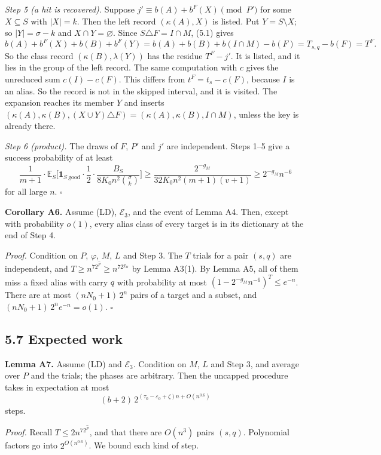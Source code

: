 \documentclass[10pt,a4paper]{article}
\begin{document}
\emph{Step 5 (a hit is recovered).} Suppose $j' \equiv b(A) + b^F(X) \pmod{P'}$ for some $X \subseteq S$ with $|X| = k$. Then the
left record $(\kappa(A), X)$ is listed. Put $Y = S\setminus X$; so $|Y| = \sigma - k$ and $X\cap Y = \varnothing$. Since
$S\triangle F = I\cap M$, (5.1) gives
\[b(A) + b^F(X) + b(B) + b^F(Y) = b(A) + b(B) + b(I\cap M) - b(F) = T_{s,q} - b(F) = T^F.\]
So the class record $(\kappa(B), \lambda(Y))$ has the residue $T^F - j'$. It is listed, and it lies in the group of the
left record. The same computation with $c$ gives the unreduced sum $c(I) - c(F)$. This differs from
$t^F = t_s - c(F)$, because $I$ is an alias. So the record is not in the skipped interval, and it is visited. The
expansion reaches its member $Y$ and inserts $(\kappa(A), \kappa(B), (X\cup Y)\triangle F) = (\kappa(A), \kappa(B), I\cap M)$,
unless the key is already there.

\emph{Step 6 (product).} The draws of $F$, $P'$ and $j'$ are independent. Steps 1--5 give a success probability of at least
\[\frac1{m+1}\cdot\mathbb E_S\Big[\mathbf 1_{S\ \text{good}}\cdot\frac12\cdot\frac{B_S}{8K_0n^2\binom\sigma k}\Big]
\ge \frac{2^{-g_M}}{32K_0n^2(m+1)(v+1)} \ge 2^{-g_M}n^{-6}\]
for all large $n$. $\square$

\textbf{Corollary A6.} Assume (LD), $\mathcal E_3$, and the event of Lemma A4. Then, except with probability $o(1)$, every
alias class of every target is in its dictionary at the end of Step 4.

\emph{Proof.} Condition on $P$, $\varphi$, $M$, $L$ and Step 3. The $T$ trials for a pair $(s, q)$ are independent, and
$T \ge n^72^{\hat F} \ge n^72^{g_M}$ by Lemma A3(1). By Lemma A5, all of them miss a fixed alias with carry $q$ with
probability at most $(1 - 2^{-g_M}n^{-6})^T \le e^{-n}$. There are at most $(nN_0+1)\,2^n$ pairs of a target and a
subset, and $(nN_0 + 1)\,2^ne^{-n} = o(1)$. $\square$

\subsection*{5.7 Expected work}

\textbf{Lemma A7.} Assume (LD) and $\mathcal E_3$. Condition on $M$, $L$ and Step 3, and average over $P$ and the trials; the
phases are arbitrary. Then the uncapped procedure takes in expectation at most
\[(b+2)\,2^{(\tau_0 - \varepsilon_0 + \zeta)n + O(n^{0.6})}\]
steps.

\emph{Proof.} Recall $T \le 2n^72^{\hat F}$, and that there are $O(n^3)$ pairs $(s, q)$. Polynomial factors go into
$2^{O(n^{0.6})}$. We bound each kind of step.
\end{document}
